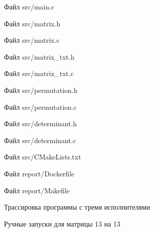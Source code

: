 \documentclass[12pt,a4paper]{article}
\begin{document}
\begin{listingblock}{Файл src/main.c}
\end{listingblock}
\begin{listingblock}{Файл src/matrix.h}
\end{listingblock}
\begin{listingblock}{Файл src/matrix.c}
\end{listingblock}
\begin{listingblock}{Файл src/matrix\_txt.h}
\end{listingblock}
\begin{listingblock}{Файл src/matrix\_txt.c}
\end{listingblock}
\begin{listingblock}{Файл src/permutation.h}
\end{listingblock}
\begin{listingblock}{Файл src/permutation.c}
\end{listingblock}
\begin{listingblock}{Файл src/determinant.h}
\end{listingblock}
\begin{listingblock}{Файл src/determinant.c}
\end{listingblock}
\begin{listingblock}{Файл src/CMakeLists.txt}
\end{listingblock}
\begin{listingblock}{Файл report/Dockerfile}
\end{listingblock}
\begin{listingblock}{Файл report/Makefile}
\end{listingblock}

\begin{listingblock}{Трассировка программы с тремя исполнителями}
\end{listingblock}

\begin{listingblock}{Ручные запуски для матрицы 13 на 13}
\end{listingblock}
\end{document}
